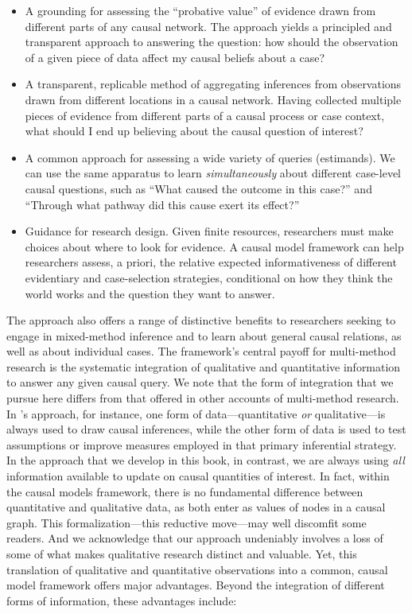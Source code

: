 \documentclass[
  12pt,
]{book}
\providecommand{\tightlist}{%
  \setlength{\itemsep}{0pt}\setlength{\parskip}{0pt}}
\begin{document}
\begin{itemize}
\item
  A grounding for assessing the ``probative value'' of evidence drawn from different parts of any causal network. The approach yields a principled and transparent approach to answering the question: how should the observation of a given piece of data affect my causal beliefs about a case?
\item
  A transparent, replicable method of aggregating inferences from observations drawn from different locations in a causal network. Having collected multiple pieces of evidence from different parts of a causal process or case context, what should I end up believing about the causal question of interest?
\item
  A common approach for assessing a wide variety of queries (estimands). We can use the same apparatus to learn \emph{simultaneously} about different case-level causal questions, such as ``What caused the outcome in this case?'' and ``Through what pathway did this cause exert its effect?''
\end{itemize}

\begin{itemize}
\tightlist
\item
  Guidance for research design. Given finite resources, researchers must make choices about where to look for evidence. A causal model framework can help researchers assess, a priori, the relative expected informativeness of different evidentiary and case-selection strategies, conditional on how they think the world works and the question they want to answer.
\end{itemize}

The approach also offers a range of distinctive benefits to researchers seeking to engage in mixed-method inference and to learn about general causal relations, as well as about individual cases. The framework's central payoff for multi-method research is the systematic integration of qualitative and quantitative information to answer any given causal query. We note that the form of integration that we pursue here differs from that offered in other accounts of multi-method research. In \citet{seawrightbook}'s approach, for instance, one form of data---quantitative \emph{or} qualitative---is always used to draw causal inferences, while the other form of data is used to test assumptions or improve measures employed in that primary inferential strategy. In the approach that we develop in this book, in contrast, we are always using \emph{all} information available to update on causal quantities of interest. In fact, within the causal models framework, there is no fundamental difference between quantitative and qualitative data, as both enter as values of nodes in a causal graph. This formalization---this reductive move---may well discomfit some readers. And we acknowledge that our approach undeniably involves a loss of some of what makes qualitative research distinct and valuable. Yet, this translation of qualitative and quantitative observations into a common, causal model framework offers major advantages. Beyond the integration of different forms of information, these advantages include:
\end{document}
